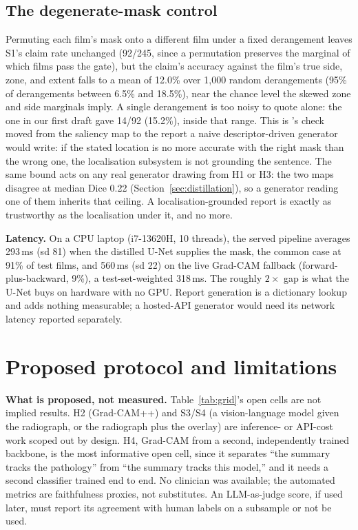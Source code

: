 \documentclass{article}
\begin{document}
\subsection{The degenerate-mask control}
Permuting each film's mask onto a different film under a fixed derangement leaves S1's claim rate unchanged (92/245, since a permutation preserves the marginal of which films pass the gate), but the claim's accuracy against the film's true side, zone, and extent falls to a mean of 12.0\% over 1{,}000 random derangements (95\% of derangements between 6.5\% and 18.5\%), near the chance level the skewed zone and side marginals imply. A single derangement is too noisy to quote alone: the one in our first draft gave 14/92 (15.2\%), inside that range. This is \citet{adebayo2018sanitychecks}'s check moved from the saliency map to the report a naive descriptor-driven generator would write: if the stated location is no more accurate with the right mask than the wrong one, the localisation subsystem is not grounding the sentence. The same bound acts on any real generator drawing from H1 or H3: the two maps disagree at median Dice 0.22 (Section~\ref{sec:distillation}), so a generator reading one of them inherits that ceiling. A localisation-grounded report is exactly as trustworthy as the localisation under it, and no more.

\textbf{Latency.} On a CPU laptop (i7-13620H, 10 threads), the served pipeline averages 293\,ms (sd 81) when the distilled U-Net supplies the mask, the common case at 91\% of test films, and 560\,ms (sd 22) on the live Grad-CAM fallback (forward-plus-backward, 9\%), a test-set-weighted 318\,ms. The roughly $2\times$ gap is what the U-Net buys on hardware with no GPU. Report generation is a dictionary lookup and adds nothing measurable; a hosted-API generator would need its network latency reported separately.

\section{Proposed protocol and limitations}
\label{sec:limitations}

\textbf{What is proposed, not measured.} Table~\ref{tab:grid}'s open cells are not implied results. H2 (Grad-CAM++) and S3/S4 (a vision-language model given the radiograph, or the radiograph plus the overlay) are inference- or API-cost work scoped out by design. H4, Grad-CAM from a second, independently trained backbone, is the most informative open cell, since it separates ``the summary tracks the pathology'' from ``the summary tracks this model,'' and it needs a second classifier trained end to end. No clinician was available; the automated metrics are faithfulness proxies, not substitutes. An LLM-as-judge score, if used later, must report its agreement with human labels on a subsample or not be used.
\end{document}
